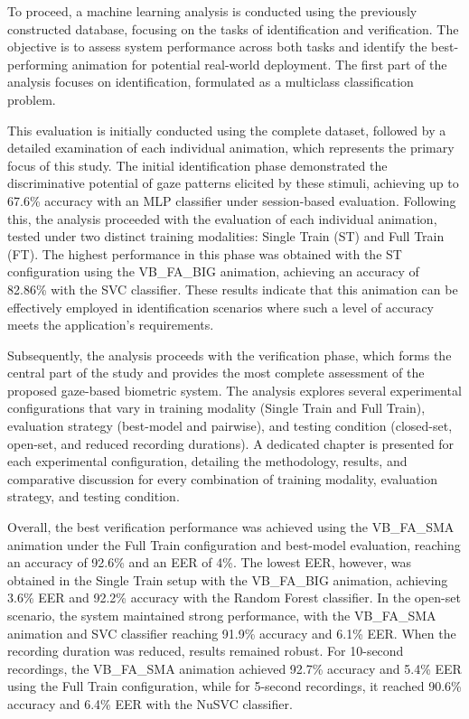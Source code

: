 \documentclass[12pt]{report}
\begin{document}
To proceed, a machine learning analysis is conducted using the previously constructed database, focusing on the tasks of identification and verification.
The objective is to assess system performance across both tasks and identify the best-performing animation for potential real-world deployment.
The first part of the analysis focuses on identification, formulated as a multiclass classification problem. 

This evaluation is initially conducted using the complete dataset, followed by a detailed examination of each individual animation, which represents the primary focus of this study.
The initial identification phase demonstrated the discriminative potential of gaze patterns elicited by these stimuli, achieving up to 67.6\% accuracy with an MLP classifier under session-based evaluation. 
Following this, the analysis proceeded with the evaluation of each individual animation, tested under two distinct training modalities: Single Train (ST) and Full Train (FT). 
The highest performance in this phase was obtained with the ST configuration using the VB\_FA\_BIG animation, achieving an accuracy of 82.86\% with the SVC classifier. 
These results indicate that this animation can be effectively employed in identification scenarios where such a level of accuracy meets the application’s requirements.

Subsequently, the analysis proceeds with the verification phase, which forms the central part of the study and provides the most complete assessment of the proposed gaze-based biometric system.
The analysis explores several experimental configurations that vary in training modality (Single Train and Full Train), evaluation strategy (best-model and pairwise), and testing condition (closed-set, open-set, and reduced recording durations).
A dedicated chapter is presented for each experimental configuration, detailing the methodology, results, and comparative discussion for every combination of training modality, evaluation strategy, and testing condition.

Overall, the best verification performance was achieved using the VB\_FA\_SMA animation under the Full Train configuration and best-model evaluation, reaching an accuracy of 92.6\% and an EER of 4\%.
The lowest EER, however, was obtained in the Single Train setup with the VB\_FA\_BIG animation, achieving 3.6\% EER and 92.2\% accuracy with the Random Forest classifier.
In the open-set scenario, the system maintained strong performance, with the VB\_FA\_SMA animation and SVC classifier reaching 91.9\% accuracy and 6.1\% EER.
When the recording duration was reduced, results remained robust.
For 10-second recordings, the VB\_FA\_SMA animation achieved 92.7\% accuracy and 5.4\% EER using the Full Train configuration, while for 5-second recordings, it reached 90.6\% accuracy and 6.4\% EER with the NuSVC classifier.
\end{document}
